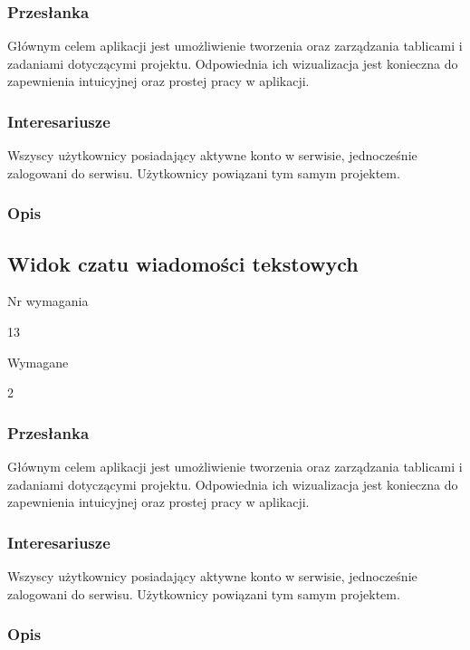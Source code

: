 \documentclass[eng,printmode]{mgr}
\begin{document}
\subsubsection{Przesłanka}
Głównym celem aplikacji jest umożliwienie tworzenia oraz zarządzania tablicami i zadaniami dotyczącymi projektu. Odpowiednia ich wizualizacja jest konieczna do zapewnienia intuicyjnej oraz prostej pracy w aplikacji.

\subsubsection{Interesariusze}
Wszyscy użytkownicy posiadający aktywne konto w serwisie, jednocześnie zalogowani do serwisu. Użytkownicy powiązani tym samym projektem.

\subsubsection{Opis}

\newpage

\subsection{Widok czatu wiadomości tekstowych}
\begin{labeling}{Nr wymagania}
\item [Nr wymagania:] 13
\item [Priorytet:] Wymagane
\item [Powiązania:] 2
\end{labeling}

\subsubsection{Przesłanka}
Głównym celem aplikacji jest umożliwienie tworzenia oraz zarządzania tablicami i zadaniami dotyczącymi projektu. Odpowiednia ich wizualizacja jest konieczna do zapewnienia intuicyjnej oraz prostej pracy w aplikacji.

\subsubsection{Interesariusze}
Wszyscy użytkownicy posiadający aktywne konto w serwisie, jednocześnie zalogowani do serwisu. Użytkownicy powiązani tym samym projektem.

\subsubsection{Opis}
\newpage
\end{document}

